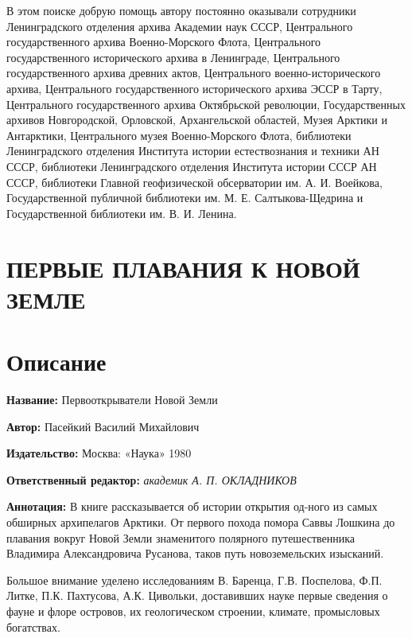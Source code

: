 \documentclass[12pt, a4paper, openany]{book}
\begin{document}
В этом поиске добрую помощь автору постоянно оказывали сотрудники Ленинградского отделения архива Академии наук СССР, Центрального государственного архива Военно-Морского Флота, Центрального государственного исторического архива в Ленинграде, Центрального государственного архива древних актов, Центрального военно-исторического архива, Центрального государственного исторического архива ЭССР в Тарту, Центрального государственного архива Октябрьской революции, Государственных архивов Новгородской, Орловской, Архангельской областей, Музея Арктики и Антарктики, Центрального музея Военно-Морского Флота, библиотеки Ленинградского отделения Института истории естествознания и техники АН СССР, библиотеки Ленинградского отделения Института истории СССР АН СССР, библиотеки Главной геофизической обсерватории им. А. И. Воейкова, Государственной публичной библиотеки им. М. Е. Салтыкова-Щедрина и Государственной библиотеки им. В. И. Ленина. 

	\section[Первые плавания к Новой Земле]{\center ПЕРВЫЕ ПЛАВАНИЯ К НОВОЙ ЗЕМЛЕ }
	
	\newpage
	\tableofcontents
	
	\thispagestyle{empty} %
	
	\newpage
	
	\setcounter{secnumdepth}{0}
	
	
		\section*{Описание}
	
	{\bf Название:} Первооткрыватели Новой Земли
	
{\bf Автор:} Пасейкий Василий Михайлович
	
{\bf Издательство:} Москва: «Наука» 1980
	
		{\bf Ответственный редактор:} \textit{академик А. П. ОКЛАДНИКОВ}

	
		{\bf Аннотация:} В книге рассказывается об истории открытия од-ного из самых обширных архипелагов Арктики. От  первого похода помора Саввы Лошкина до плавания  вокруг Новой Земли знаменитого полярного путешественника Владимира Александровича Русанова, таков путь новоземельских изысканий. 
		
		Большое внимание уделено исследованиям В. Баренца, Г.В. Поспелова, Ф.П. Литке, П.К. Пахтусова, А.К. Цивольки, доставивших науке первые сведения о фауне и флоре островов, их геологическом строении, климате, промысловых богатствах.
		\thispagestyle{empty} %

	
\end{document}
